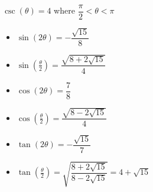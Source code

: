 {$\csc(\theta) = 4$ where $\dfrac{\pi}{2} < \theta < \pi$}
{\begin{itemize}
\item $\sin(2\theta) = -\dfrac{\sqrt{15}}{8}$
\item $\sin\left(\frac{\theta}{2}\right) =\dfrac{\sqrt{8+2\sqrt{15}}}{4}$
\item $\cos(2\theta) = \dfrac{7}{8}$
\item $\cos\left(\frac{\theta}{2}\right) = \dfrac{\sqrt{8-2\sqrt{15}}}{4}$
\item $\tan(2\theta) = -\dfrac{\sqrt{15}}{7}$
\item $\tan\left(\frac{\theta}{2}\right) = \sqrt{\dfrac{8+2\sqrt{15}}{8-2\sqrt{15}}}  = 4+\sqrt{15}$
\end{itemize}
}
